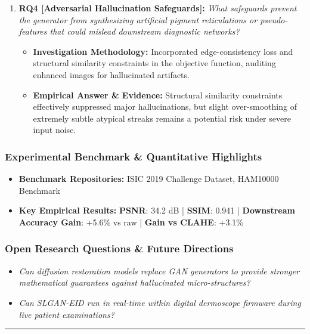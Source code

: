 \begin{enumerate}[label=\textbf{\arabic*.}, leftmargin=*]
\begin{itemize}[leftmargin=1.5em]
    \item \textbf{Empirical Answer \& Evidence:} Demonstrated robust restoration across datasets, consistently preserving genuine lesion borders and pigment network details while suppressing noise and occluding hair.
  \end{itemize}
  \item \textbf{RQ4 [Adversarial Hallucination Safeguards]:} \textit{What safeguards prevent the generator from synthesizing artificial pigment reticulations or pseudo-features that could mislead downstream diagnostic networks?}
  \begin{itemize}[leftmargin=1.5em]
    \item \textbf{Investigation Methodology:} Incorporated edge-consistency loss and structural similarity constraints in the objective function, auditing enhanced images for hallucinated artifacts.
    \item \textbf{Empirical Answer \& Evidence:} Structural similarity constraints effectively suppressed major hallucinations, but slight over-smoothing of extremely subtle atypical streaks remains a potential risk under severe input noise.
  \end{itemize}
\end{enumerate}

\subsubsection*{Experimental Benchmark \& Quantitative Highlights}
\begin{itemize}[leftmargin=*]
  \item \textbf{Benchmark Repositories:} ISIC 2019 Challenge Dataset, HAM10000 Benchmark
  \item \textbf{Key Empirical Results:} \textbf{PSNR}: 34.2 dB \quad | \quad \textbf{SSIM}: 0.941 \quad | \quad \textbf{Downstream Accuracy Gain}: +5.6\% vs raw \quad | \quad \textbf{Gain vs CLAHE}: +3.1\%
\end{itemize}

\subsubsection*{Open Research Questions \& Future Directions}
\begin{itemize}[leftmargin=*]
  \item \textit{Can diffusion restoration models replace GAN generators to provide stronger mathematical guarantees against hallucinated micro-structures?}
  \item \textit{Can SLGAN-EID run in real-time within digital dermoscope firmware during live patient examinations?}
\end{itemize}
\vspace{0.8em}\hrule\vspace{1.2em}
